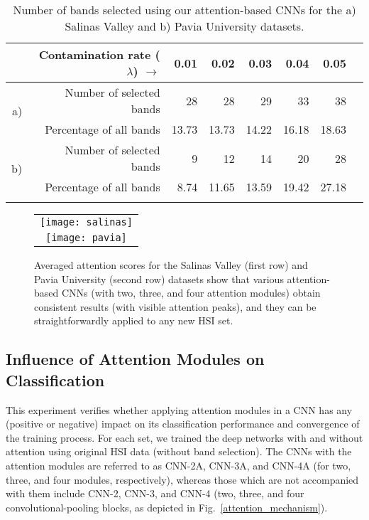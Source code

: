 \documentclass[journal]{IEEEtran}
\newcommand{\ContaminationRate}{\lambda}
\begin{document}
\begin{table}[ht!]
	\scriptsize
	\centering
	\caption{Number of bands selected using our attention-based CNNs for the a) Salinas Valley and b) Pavia University datasets.}
	\label{tab:number_of_selected_bands}
	\renewcommand{\tabcolsep}{0.23cm}
	\begin{tabular}{rrrrrrrr}
		\Xhline{2\arrayrulewidth}
		&Contamination rate ($\ContaminationRate$) $\rightarrow$ & 0.01 & 0.02 & 0.03 & 0.04 & 0.05 \\
		\hline
		\multirow{2}{*}{a)}   & Number of selected bands & 28 & 28 & 29 & 33 & 38 \\
		                      & Percentage of all bands & 13.73 & 13.73 & 14.22 & 16.18 & 18.63 \\
\hline
		\multirow{2}{*}{b)}   & Number of selected bands & 9 & 12 & 14 & 20 & 28 \\
		                      & Percentage of all bands & 8.74 & 11.65 & 13.59 & 19.42 & 27.18 \\
		\Xhline{2\arrayrulewidth}
	\end{tabular}
\end{table}

\begin{figure*}[ht!]
	\centering
\begin{tabular}{c}
	\texttt{[image: salinas]}\\
\texttt{[image: pavia]}
\end{tabular}
	\caption{Averaged attention scores for the Salinas Valley (first row) and Pavia University (second row) datasets show that various attention-based CNNs (with two, three, and four attention modules) obtain consistent results (with visible attention peaks), and they can be straightforwardly applied to any new HSI set.}
	\label{fig:salinas_pavia_bands}
\end{figure*}


\subsection{Influence of Attention Modules on Classification}

This experiment verifies whether applying attention modules in a CNN has any (positive or negative) impact on its classification performance and convergence of the training process. For each set, we trained the deep networks with and without attention using original HSI data (without band selection). The CNNs with the attention modules are referred to as CNN-2A, CNN-3A, and CNN-4A (for two, three, and four modules, respectively), whereas those which are not accompanied with them include CNN-2, CNN-3, and CNN-4 (two, three, and four convolutional-pooling blocks, as depicted in Fig.~\ref{attention_mechanism}).
\end{document}
